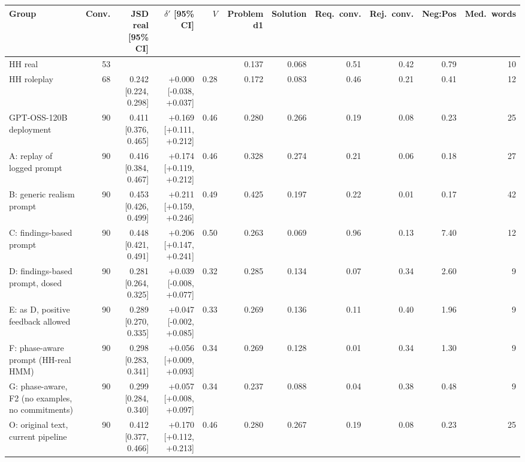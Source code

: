 \begin{tabular}{lrrrrrrrrrr}
\toprule
Group & Conv. & JSD real [95\% CI] & $\delta'$ [95\% CI] & $V$ & Problem d1 & Solution & Req.\ conv. & Rej.\ conv. & Neg:Pos & Med.\ words \\
\midrule
HH real & 53 &  &  &  & 0.137 & 0.068 & 0.51 & 0.42 & 0.79 & 10 \\
HH roleplay & 68 & 0.242 [0.224, 0.298] & +0.000 [-0.038, +0.037] & 0.28 & 0.172 & 0.083 & 0.46 & 0.21 & 0.41 & 12 \\
GPT-OSS-120B deployment & 90 & 0.411 [0.376, 0.465] & +0.169 [+0.111, +0.212] & 0.46 & 0.280 & 0.266 & 0.19 & 0.08 & 0.23 & 25 \\
A: replay of logged prompt & 90 & 0.416 [0.384, 0.467] & +0.174 [+0.119, +0.212] & 0.46 & 0.328 & 0.274 & 0.21 & 0.06 & 0.18 & 27 \\
B: generic realism prompt & 90 & 0.453 [0.426, 0.499] & +0.211 [+0.159, +0.246] & 0.49 & 0.425 & 0.197 & 0.22 & 0.01 & 0.17 & 42 \\
C: findings-based prompt & 90 & 0.448 [0.421, 0.491] & +0.206 [+0.147, +0.241] & 0.50 & 0.263 & 0.069 & 0.96 & 0.13 & 7.40 & 12 \\
D: findings-based prompt, dosed & 90 & 0.281 [0.264, 0.325] & +0.039 [-0.008, +0.077] & 0.32 & 0.285 & 0.134 & 0.07 & 0.34 & 2.60 & 9 \\
E: as D, positive feedback allowed & 90 & 0.289 [0.270, 0.335] & +0.047 [-0.002, +0.085] & 0.33 & 0.269 & 0.136 & 0.11 & 0.40 & 1.96 & 9 \\
F: phase-aware prompt (HH-real HMM) & 90 & 0.298 [0.283, 0.341] & +0.056 [+0.009, +0.093] & 0.34 & 0.269 & 0.128 & 0.01 & 0.34 & 1.30 & 9 \\
G: phase-aware, F2 (no examples, no commitments) & 90 & 0.299 [0.284, 0.340] & +0.057 [+0.008, +0.097] & 0.34 & 0.237 & 0.088 & 0.04 & 0.38 & 0.48 & 9 \\
O: original text, current pipeline & 90 & 0.412 [0.377, 0.466] & +0.170 [+0.112, +0.213] & 0.46 & 0.280 & 0.267 & 0.19 & 0.08 & 0.23 & 25 \\
\bottomrule
\end{tabular}
